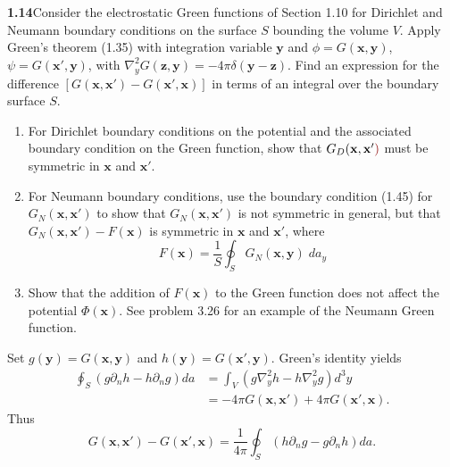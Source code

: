\par\bigskip
\noindent\textbf{1.14}\quad Consider the electrostatic Green functions of Section 1.10 for Dirichlet and Neumann boundary conditions on the surface $S$ bounding the volume $V$. Apply Green's theorem (1.35) with integration variable $\mathbf{y}$ and $\phi=G(\mathbf{x},\mathbf{y})$, $\psi=G(\mathbf{x}',\mathbf{y})$, with $\nabla^{2}_{y}G(\mathbf{z},\mathbf{y})=-4\pi\delta(\mathbf{y}-\mathbf{z})$. Find an expression for the difference $[G(\mathbf{x},\mathbf{x}')-G(\mathbf{x}',\mathbf{x})]$ in terms of an integral over the boundary surface $S$.
\begin{enumerate}
\item[(a)] For Dirichlet boundary conditions on the potential and the associated boundary condition on the Green function, show that $G_{D}(\mathbf{x},\mathbf{x}'\erratum{)}$ must be symmetric in $\mathbf{x}$ and $\mathbf{x}'$.
\item[(b)] For Neumann boundary conditions, use the boundary condition (1.45) for $G_{N}(\mathbf{x},\mathbf{x}')$ to show that $G_{N}(\mathbf{x},\mathbf{x}')$ is not symmetric in general, but that $G_{N}(\mathbf{x},\mathbf{x}')-F(\mathbf{x})$ is symmetric in $\mathbf{x}$ and $\mathbf{x}'$, where
\[
F(\mathbf{x}) = \frac{1}{S}\oint_{S}G_{N}(\mathbf{x},\mathbf{y})\;da_{y}
\]
\item[(c)] Show that the addition of $F(\mathbf{x})$ to the Green function does not affect the potential $\Phi(\mathbf{x})$. See problem 3.26 for an example of the Neumann Green function.
\end{enumerate}
\solution
Set $g(\mathbf y)=G(\mathbf x,\mathbf y)$ and
$h(\mathbf y)=G(\mathbf x',\mathbf y)$. Green's identity yields
\[
\begin{split}
\oint_S(g\partial_nh-h\partial_ng)da
&=\int_V(g\nabla_y^2h-h\nabla_y^2g)d^3y\\
&=-4\pi G(\mathbf x,\mathbf x')+4\pi G(\mathbf x',\mathbf x).
\end{split}
\]
Thus
\[
\boxed{G(\mathbf x,\mathbf x')-G(\mathbf x',\mathbf x)
=\frac1{4\pi}\oint_S(h\partial_ng-g\partial_nh)da.}
\]
